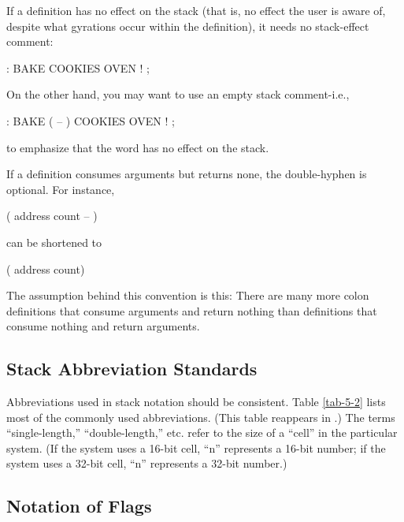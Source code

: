 If a definition has no effect on the stack (that is, no effect the user is
aware of, despite what gyrations occur within the definition), it needs no
stack-effect comment:
\begin{Code}
: BAKE   COOKIES OVEN ! ;
\end{Code}
On the other hand, you may want to use an empty stack comment-i.e.,
\begin{Code}
: BAKE  ( -- )  COOKIES OVEN ! ;
\end{Code}
to emphasize that the word has no effect on the stack.

If a definition consumes arguments but returns none, the double-hyphen
is optional.  For instance,
\begin{Code}
( address count -- )
\end{Code}
can be shortened to
\begin{Code}
( address count)
\end{Code}
The assumption behind this convention is this: There are many more
colon definitions that consume arguments and return nothing than
definitions that consume nothing and return arguments.

\subsection{Stack Abbreviation Standards}

Abbreviations used in stack notation should be consistent. Table \ref{tab-5-2} lists
most of the commonly used abbreviations.  (This table reappears in .)
The terms ``single-length,'' ``double-length,'' etc. refer to
the size of a ``cell'' in the particular \Forth{} system.  (If the system uses a
16-bit cell, ``n'' represents a 16-bit number; if the system uses a 32-bit
cell, ``n'' represents a 32-bit number.)

\subsection{Notation of Flags}

